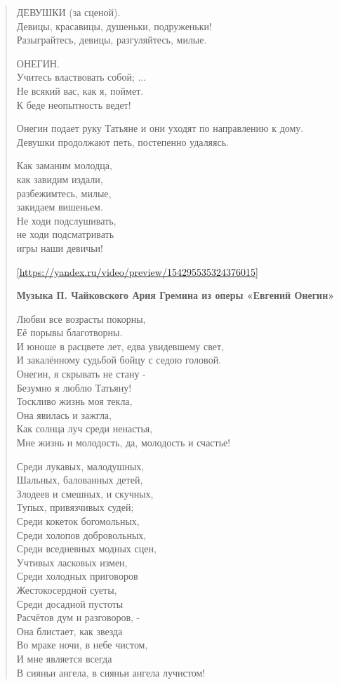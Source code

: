 \begin{verse}
ДЕВУШКИ (за сценой).\\
Девицы, красавицы, душеньки, подруженьки!\\
Разыграйтесь, девицы, разгуляйтесь, милые.

ОНЕГИН.\\
Учитесь властвовать собой; ...\\
Не всякий вас, как я, поймет.\\
К беде неопытность ведет!

Онегин подает руку Татьяне и они уходят по направлению к дому. Девушки продолжают петь, постепенно удаляясь.

Как заманим молодца,\\
как завидим издали,\\
разбежимтесь, милые,\\
закидаем вишеньем.\\
Не ходи подслушивать,\\
не ходи подсматривать\\
игры наши девичьи!


\ref{https://yandex.ru/video/preview/154295535324376015}

\textbf{Музыка П. Чайковского Ария Гремина из оперы «Евгений Онегин»}

Любви все возрасты покорны,\\
Её порывы благотворны.\\
И юноше в расцвете лет, едва увидевшему свет,\\
И закалённому судьбой бойцу с седою головой.\\

Онегин, я скрывать не стану -\\
Безумно я люблю Татьяну!\\
Тоскливо жизнь моя текла,\\
Она явилась и зажгла,\\
Как солнца луч среди ненастья,\\
Мне жизнь и молодость, да, молодость и счастье!

Среди лукавых, малодушных,\\
Шальных, балованных детей,\\
Злодеев и смешных, и скучных,\\
Тупых, привязчивых судей;\\
Среди кокеток богомольных,\\
Среди холопов добровольных,\\
Среди вседневных модных сцен,\\
Учтивых ласковых измен,\\
Среди холодных приговоров\\
Жестокосердной суеты,\\
Среди досадной пустоты\\
Расчётов дум и разговоров, -\\
Она блистает, как звезда\\
Во мраке ночи, в небе чистом,\\
И мне является всегда\\
В сияньи ангела, в сияньи ангела лучистом!


\end{verse}
